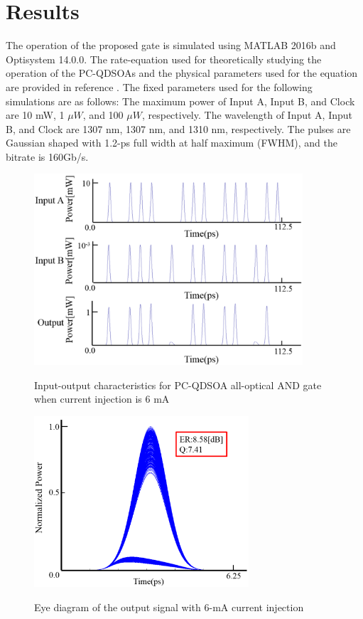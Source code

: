 \documentclass[twocolumn]{el-author}
\begin{document}
\section{Results}
The operation of the proposed gate is simulated using MATLAB 2016b and Optisystem 14.0.0. The rate-equation used for theoretically studying the operation of the PC-QDSOAs and the physical parameters used for the equation are provided in reference {\cite{pcqdsoa}}. The fixed parameters used for the following simulations are as follows: The maximum power of Input A, Input B, and Clock are 10 mW, 1 $\mu W$, and 100 $\mu W$, respectively. The wavelength of Input A, Input B, and Clock are 1307 nm, 1307 nm, and 1310 nm, respectively. The pulses are Gaussian shaped with 1.2-ps full width at half maximum (FWHM), and the bitrate is 160Gb/s. \par

\begin{figure}[htbp]
\begin{center}
  \includegraphics[width=100mm,bb=0 0 960 520]{in-out.pdf}
  \caption{Input-output characteristics for PC-QDSOA all-optical AND gate when current injection is 6 mA}
  \label{fig:output_signal}
  \includegraphics[width=80mm,bb=0 0 720 580]{eyedia_6mA.pdf}
  \caption{Eye diagram of the output signal with 6-mA current injection}
  \label{fig:eye_dia}
\end{center}
\end{figure}
\end{document}
